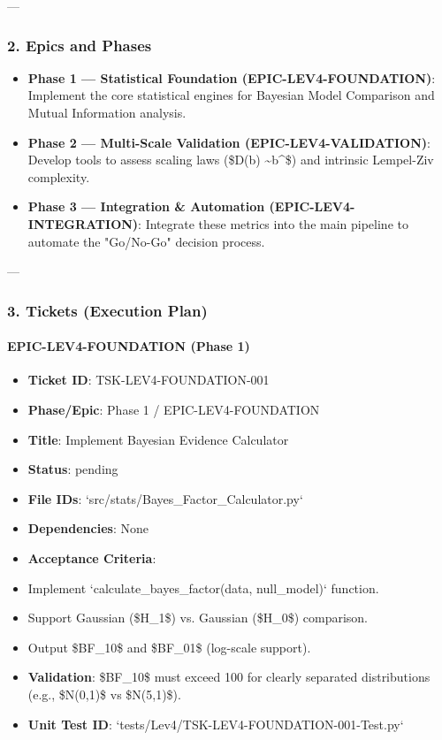 \documentclass{article}
\begin{document}
---

\subsubsection{2. Epics and Phases}

\begin{itemize}
\item   \textbf{Phase 1 — Statistical Foundation (EPIC-LEV4-FOUNDATION)}: Implement the core statistical engines for Bayesian Model Comparison and Mutual Information analysis.
\item   \textbf{Phase 2 — Multi-Scale Validation (EPIC-LEV4-VALIDATION)}: Develop tools to assess scaling laws (\$D(b) \sim b^\alpha\$) and intrinsic Lempel-Ziv complexity.
\item   \textbf{Phase 3 — Integration \& Automation (EPIC-LEV4-INTEGRATION)}: Integrate these metrics into the main pipeline to automate the "Go/No-Go" decision process.
\end{itemize}

---

\subsubsection{3. Tickets (Execution Plan)}

\paragraph{EPIC-LEV4-FOUNDATION (Phase 1)}

\begin{itemize}
\item   \textbf{Ticket ID}: TSK-LEV4-FOUNDATION-001
\item   \textbf{Phase/Epic}: Phase 1 / EPIC-LEV4-FOUNDATION
\item   \textbf{Title}: Implement Bayesian Evidence Calculator
\item   \textbf{Status}: pending
\item   \textbf{File IDs}: `src/stats/Bayes\_Factor\_Calculator.py`
\item   \textbf{Dependencies}: None
\item   \textbf{Acceptance Criteria}:
\item   Implement `calculate\_bayes\_factor(data, null\_model)` function.
\item   Support Gaussian (\$H\_1\$) vs. Gaussian (\$H\_0\$) comparison.
\item   Output \$BF\_{10}\$ and \$BF\_{01}\$ (log-scale support).
\item   \textbf{Validation}: \$BF\_{10}\$ must exceed 100 for clearly separated distributions (e.g., \$N(0,1)\$ vs \$N(5,1)\$).
\item   \textbf{Unit Test ID}: `tests/Lev4/TSK-LEV4-FOUNDATION-001-Test.py`
\end{itemize}
\end{document}
